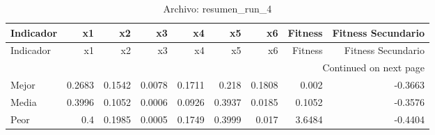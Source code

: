 \begin{longtable}{lrrrrrrrr}
\caption{Archivo: resumen\_run\_4}\label{tab:resumen_run_4} \\
\toprule
Indicador & x1 & x2 & x3 & x4 & x5 & x6 & Fitness & Fitness Secundario \\
\midrule
\endfirsthead
\toprule
Indicador & x1 & x2 & x3 & x4 & x5 & x6 & Fitness & Fitness Secundario \\
\midrule
\endhead
\midrule
\multicolumn{9}{r}{Continued on next page} \\
\midrule
\endfoot
\bottomrule
\endlastfoot
Mejor & 0.2683 & 0.1542 & 0.0078 & 0.1711 & 0.218 & 0.1808 & 0.002 & -0.3663 \\
Media & 0.3996 & 0.1052 & 0.0006 & 0.0926 & 0.3937 & 0.0185 & 0.1052 & -0.3576 \\
Peor & 0.4 & 0.1985 & 0.0005 & 0.1749 & 0.3999 & 0.017 & 3.6484 & -0.4404 \\
\end{longtable}